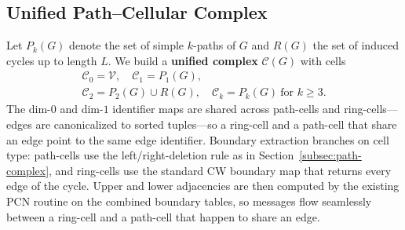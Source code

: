\documentclass[letterpaper]{article} %
\begin{document}
\subsection{Unified Path--Cellular Complex} \label{subsec:unified}
Let \(P_k(G)\) denote the set of simple \(k\)-paths of \(G\) and \(R(G)\) the set of induced cycles up to length \(L\). We build a \textbf{unified complex} \(\mathcal{C}(G)\) with cells
\begin{gather*}
    \mathcal{C}_0 = \mathcal{V}, \quad \mathcal{C}_1 = P_1(G), \\
    \mathcal{C}_2 = P_2(G) \cup R(G), \quad \mathcal{C}_k = P_k(G) \ \text{for } k \geq 3.
\end{gather*}
The dim-\(0\) and dim-\(1\) identifier maps are shared across path-cells and ring-cells---edges are canonicalized to sorted tuples---so a ring-cell and a path-cell that share an edge point to the same edge identifier. Boundary extraction branches on cell type: path-cells use the left/right-deletion rule as in Section~\ref{subsec:path-complex}, and ring-cells use the standard CW boundary map that returns every edge of the cycle. Upper and lower adjacencies are then computed by the existing PCN routine on the combined boundary tables, so messages flow seamlessly between a ring-cell and a path-cell that happen to share an edge.
\end{document}
